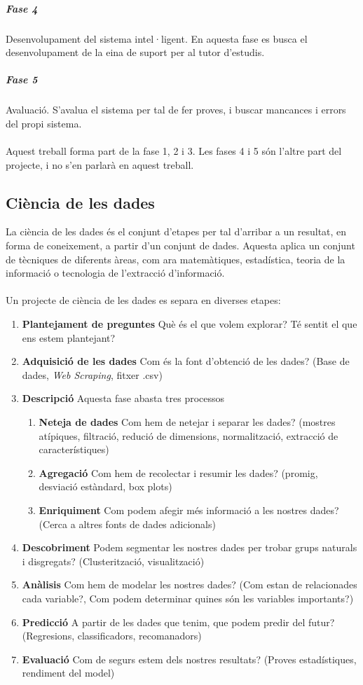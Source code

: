 \documentclass[12pt,a4paper,catalan]{article}
\begin{document}
\subparagraph{Fase 4}
Desenvolupament del sistema intel·ligent. En aquesta fase es busca el desenvolupament de la eina de suport per al tutor d'estudis.

\subparagraph{Fase 5}
Avaluació. S'avalua el sistema per tal de fer proves, i buscar mancances i errors del propi sistema.
\\
\\
Aquest treball forma part de la fase 1, 2 i 3. Les fases 4 i 5 són l'altre part del projecte, i no s'en parlarà en aquest treball.

\subsection{Ciència de les dades}
\label{subsec:cienciadelesdades}
La ciència de les dades és el conjunt d'etapes per tal d'arribar a un resultat, en forma de coneixement, a partir d'un conjunt de dades. Aquesta aplica un conjunt de tècniques de diferents àreas, com ara matemàtiques, estadística, teoria de la informació o tecnologia de l'extracció d'informació.
\\
\\
Un projecte de ciència de les dades es separa en diverses etapes:
\begin{enumerate}
	\item \textbf{Plantejament de preguntes} Què és el que volem explorar? Té sentit el que ens estem plantejant?
	\item \textbf{Adquisició de les dades} Com és la font d'obtenció de les dades? (Base de dades, \textit{Web Scraping}, fitxer .csv)
	\item \textbf{Descripció} Aquesta fase abasta tres processos
	\begin{enumerate}
		\item \textbf{Neteja de dades} Com hem de netejar i separar les dades? (mostres atípiques, filtració, redució de dimensions, normalització, extracció de característiques)
		\item \textbf{Agregació} Com hem de recolectar i resumir les dades? (promig, desviació estàndard, box plots)
		\item \textbf{Enriquiment} Com podem afegir més informació a les nostres dades? (Cerca a altres fonts de dades adicionals)
	\end{enumerate}
	\item \textbf{Descobriment} Podem segmentar les nostres dades per trobar grups naturals i disgregats? (Clusterització, visualització)
	\item \textbf{Anàlisis} Com hem de modelar les nostres dades? (Com estan de relacionades cada variable?, Com podem determinar quines són les variables importants?)
	\item \textbf{Predicció} A partir de les dades que tenim, que podem predir del futur? (Regresions, classificadors, recomanadors)
	\item \textbf{Evaluació} Com de segurs estem dels nostres resultats? (Proves estadístiques, rendiment del model)
\end{enumerate}
\end{document}
